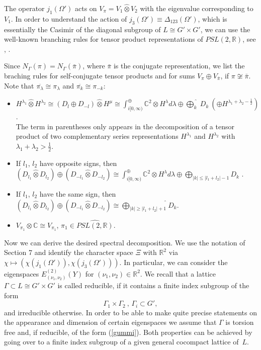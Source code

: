 \documentclass[10]{amsart}
\theoremstyle{remark}
\theoremstyle{definition}
\numberwithin{equation}{section}
\newcommand{\R}{\mathbb{R}}           %
\newcommand{\C}{\mathbb{C}}           %
\newcommand{\be}{\begin{equation}}
\begin{document}
{The operator $j_1(\Omega')$ acts on $V_\pi=V_1\hat\otimes V_2$ with the eigenvalue corresponding to $V_1$. In order to understand the action of $j_3(\Omega')\equiv \Delta_{123}(\Omega')$,
which is essentially the Casimir of the diagonal subgroup of $L\cong G'\times G'$,
we can use the well-known branching rules for tensor product representations of  $PSL(2,\mathbb{R})$, see \cite{Rep1}, \cite{Rep2}.

Since $N_\Gamma(\pi)=N_\Gamma(\bar\pi)$, where $\bar\pi$ is the conjugate representation, we list the braching rules for self-conjugate tensor products and for sums $V_\pi\oplus V_{\bar\pi}$, if $\pi\not\cong\bar\pi$.
Note that $\overline{ \pi_\lambda}\cong \pi_\lambda$ and $\overline{\pi_k}\cong \pi_{-k}$:
\begin{itemize}
\item[(a)] $\displaystyle H^{\lambda_1}\hat\otimes H^{\lambda_2}\cong (D_l\oplus D_{-l})\hat\otimes H^\mu\cong \int_{i[0,\infty)}^\oplus \C^2\otimes H^\lambda d\lambda \oplus \widehat{\bigoplus_{k}}\: D_k\ \left(\oplus H^{\lambda_1+\lambda_2-\frac{1}{2}}\right)$ .\\
The term in parentheses  only appears in the decomposition of a tensor product of two complementary series representations $H^{\lambda_1}$ and $H^{\lambda_2}$  
with $\lambda_1+\lambda_2>\frac{1}{2}$. 
\item[(b)] If $l_1$, $l_2$ have opposite signs, then\\
$\displaystyle  (D_{l_1}\hat\otimes D_{l_2})\oplus  (D_{-l_1}\hat\otimes D_{-l_2})\cong \int_{i[0,\infty)}^\oplus \C^2\otimes  H^\lambda d\lambda \oplus{\bigoplus_{|k|\le|l_1+l_2|-1}} D_k$ .
\item[(c)] If $l_1$, $l_2$ have the same sign, then\\
$\displaystyle  (D_{l_1}\hat\otimes D_{l_2})\oplus  (D_{-l_1}\hat\otimes D_{-l_2})\cong \widehat{\bigoplus_{|k|\ge |l_1+l_2|+1}} D_k$.
\item[(d)] $V_{\pi_1}\otimes \C\cong V_{\pi_1}$, $\pi_1\in  \widehat{PSL(2,\mathbb{R})}$.
\end{itemize}

Now we can derive the desired spectral decomposition. We use the notation of Section 7 and identify the character space $\Xi$ with $\R^2$ via $\chi\mapsto (\chi(j_1(\Omega')),\chi(j_3(\Omega')))$. In particular, we can consider the eigenspaces $E^{(2)}_{(\nu_1,\nu_2)}(Y)$ for $(\nu_1,\nu_2)\in\R^2$.  We recall that a lattice $\Gamma\subset L\cong G'\times G'$ is called reducible, if it contains a finite index subgroup of the form 
\be\label{gummi}\Gamma_1\times \Gamma_2\ ,\,\Gamma_i\subset G',
\end{equation}
and irreducible otherwise. In order to be able to make quite precise statements on the appearance and dimension of certain eigenspaces we assume that $\Gamma$ is torsion
free and, if reducible, of the form (\ref{gummi}). Both properties can be achieved by going over to a finite index subgroup of a given general cocompact lattice of~$L$.

}
\end{document}
